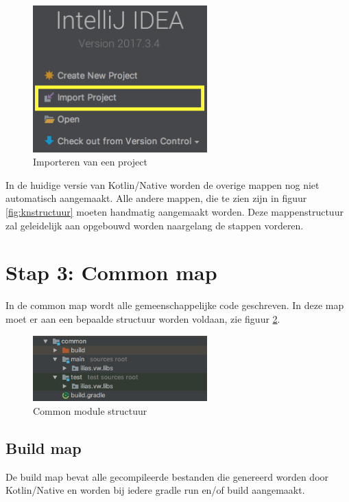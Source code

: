 \begin{figure} [ht]
	\centering
	\includegraphics[width=0.60\textwidth]{img/stap2-import.png}
	\caption{Importeren van een project}
	\label{fig:stap2-import}
\end{figure}

In de huidige versie van Kotlin/Native worden de overige mappen nog niet automatisch aangemaakt. Alle andere mappen, die te zien zijn in figuur \ref{fig:knstructuur} moeten handmatig aangemaakt worden. Deze mappenstructuur zal geleidelijk aan opgebouwd worden naargelang de stappen vorderen.

\section{Stap 3: Common map }
In de common map wordt alle gemeenschappelijke code geschreven. In deze map moet er aan een bepaalde structuur worden voldaan, zie figuur \ref{fig:stap3-common}.

\begin{figure} [ht]
	\centering
	\includegraphics[width=0.60\textwidth]{img/stap3-common.png}
	\caption{Common module structuur}
	\label{fig:stap3-common}
\end{figure}

\subsection{Build map}
De build map bevat alle gecompileerde bestanden die genereerd worden door Kotlin/Native en worden bij iedere gradle run en/of build aangemaakt.

